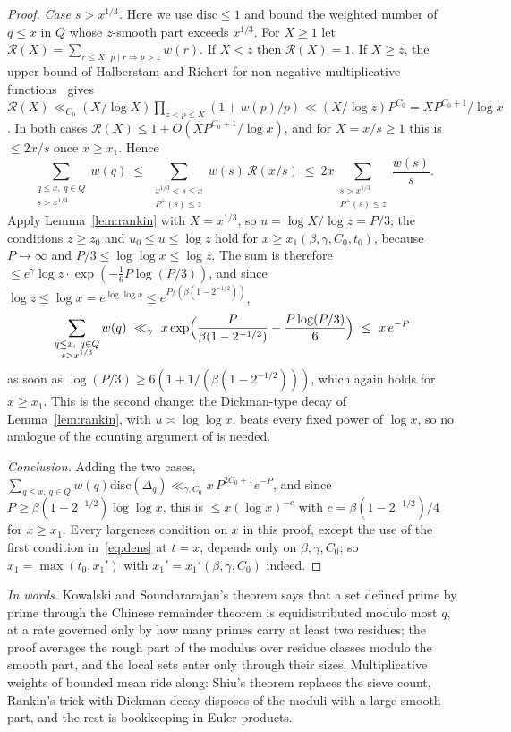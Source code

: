 \documentclass[11pt,a4paper]{article}
\theoremstyle{remark}\newtheorem{remark}[theorem]{Remark}
\begin{document}
\begin{proof}
\emph{Case $s>x^{1/3}$.} Here we use $\mathrm{disc}\le1$ and bound the weighted number of $q\le x$ in $Q$ whose
$z$-smooth part exceeds $x^{1/3}$. For $X\ge1$ let $\mathcal R(X)=\sum_{r\le X,\ p\mid r\Rightarrow p>z}w(r)$. If $X<z$ then
$\mathcal R(X)=1$. If $X\ge z$, the upper bound of Halberstam and Richert for non-negative multiplicative
functions~\cite[Theorem~III.3.5]{Tenenbaum2015} gives
$\mathcal R(X)\ll_{C_0}(X/\log X)\prod_{z<p\le X}(1+w(p)/p)\ll(X/\log z)P^{C_0}=XP^{C_0+1}/\log x$. In both cases
$\mathcal R(X)\le1+O(XP^{C_0+1}/\log x)$, and for $X=x/s\ge1$ this is $\le2x/s$ once $x\ge x_1$. Hence
\[
\sum_{\substack{q\le x,\ q\in Q\\ s>x^{1/3}}}w(q)\ \le\ \sum_{\substack{x^{1/3}<s\le x\\ P^+(s)\le z}}w(s)\,\mathcal R(x/s)\ \le\ 2x\sum_{\substack{s>x^{1/3}\\ P^+(s)\le z}}\frac{w(s)}{s}.
\]
Apply Lemma~\ref{lem:rankin} with $X=x^{1/3}$, so $u=\log X/\log z=P/3$; the conditions $z\ge z_0$ and
$u_0\le u\le\log z$ hold for $x\ge x_1(\beta,\gamma,C_0,t_0)$, because $P\to\infty$ and $P/3\le\log\log x\le\log z$. The sum is
therefore $\le e^{\gamma}\log z\cdot\exp(-\tfrac16P\log(P/3))$, and since $\log z\le\log x=e^{\log\log x}\le e^{P/(\beta(1-2^{-1/2}))}$,
\[
\sum_{\substack{q\le x,\ q\in Q\\ s>x^{1/3}}}w(q)\ \ll_\gamma\ x\exp\Bigl(\frac{P}{\beta(1-2^{-1/2})}-\frac{P\log(P/3)}6\Bigr)\ \le\ x\,e^{-P}
\]
as soon as $\log(P/3)\ge6(1+1/(\beta(1-2^{-1/2})))$, which again holds for $x\ge x_1$. This is the second change: the
Dickman-type decay of Lemma~\ref{lem:rankin}, with $u\asymp\log\log x$, beats every fixed power of $\log x$, so no
analogue of the counting argument of \cite[Lemma~3.2]{KowalskiSoundararajan2021} is needed.

\emph{Conclusion.} Adding the two cases, $\sum_{q\le x,\ q\in Q}w(q)\mathrm{disc}(\Delta_q)\ll_{\gamma,C_0}x\,P^{2C_0+1}e^{-P}$, and
since $P\ge\beta(1-2^{-1/2})\log\log x$, this is $\le x(\log x)^{-c}$ with $c=\beta(1-2^{-1/2})/4$ for $x\ge x_1$. Every largeness condition on $x$ in this proof, except the use of the first
condition in~\eqref{eq:dens} at $t=x$, depends only on $\beta,\gamma,C_0$; so $x_1=\max(t_0,x_1')$ with $x_1'=x_1'(\beta,\gamma,C_0)$ indeed.
\end{proof}

\emph{In words.} Kowalski and Soundararajan's theorem says that a set defined prime by prime through the
Chinese remainder theorem is equidistributed modulo most $q$, at a rate governed only by how many primes carry
at least two residues; the proof averages the rough part of the modulus over residue classes modulo the smooth
part, and the local sets enter only through their sizes. Multiplicative weights of bounded mean ride along:
Shiu's theorem replaces the sieve count, Rankin's trick with Dickman decay disposes of the moduli with a large
smooth part, and the rest is bookkeeping in Euler products.
\end{document}
